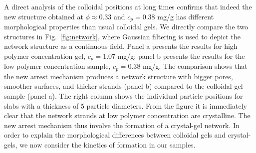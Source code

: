 \documentclass[preprint,amsmath,amssymb,superscriptaddress]{revtex4-1}
\begin{document}
A direct analysis of the colloidal positions at long times confirms that indeed the new structure obtained at
$\phi\approx 0.33$ and $c_p=0.38$ mg/g has different morphological properties than usual colloidal gels.
We directly compare the two structures in Fig.~\ref{fig:network}, where Gaussian filtering is used to depict the network structure as a continuous field.
Panel a presents the results for high
polymer concentration gel, $c_p=1.07$ mg/g; panel b presents the results for the low polymer concentration sample, $c_p=0.38$ mg/g.
The comparison shows that the new arrest mechanism produces a network structure with bigger pores, smoother surfaces, and thicker strands (panel b) compared
to the colloidal gel sample (panel a). The right column shows the individual particle positions for slabs with a thickness of 5 particle diameters. 
From the figure it is immediately clear that the network strands at low polymer concentration are crystalline. The new arrest mechanism thus
involve the formation of a crystal-gel network. In order to explain the morphological differences between colloidal gels and crystal-gels,
we now consider the kinetics of formation in our samples. 
\end{document}
